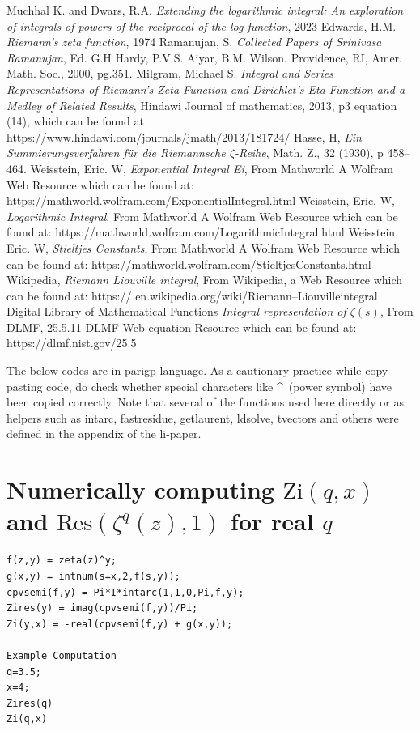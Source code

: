 \documentclass[a4paper,11pt,twoside]{amsart}
\newcommand\Zi{\mathrm{Zi}}
\newcommand\Res{\mathrm{Res}}
\begin{document}
\begin{thebibliography}{99} 
Muchhal K. and Dwars, R.A. \emph{Extending the logarithmic integral: An exploration of integrals of powers of the reciprocal of the log-function}, 2023
Edwards, H.M. \emph{Riemann's zeta function}, 1974
Ramanujan, S, \emph{Collected Papers of Srinivasa Ramanujan}, Ed. G.H Hardy, P.V.S. Aiyar, B.M. Wilson. Providence, RI, Amer. Math. Soc., 2000, pg.351.
Milgram, Michael S.  \emph{Integral and Series Representations of Riemann's Zeta Function and Dirichlet's Eta Function and a Medley of Related Results}, Hindawi Journal of mathematics, 2013, p3 equation (14), which can be found at https://www.hindawi.com/journals/jmath/2013/181724/
Hasse, H, \emph{Ein Summierungsverfahren für die Riemannsche $\zeta$-Reihe}, Math. Z., 32 (1930), p 458–464.
Weisstein, Eric. W, \emph{Exponential Integral Ei}, From Mathworld A Wolfram Web Resource which can be found at: https://mathworld.wolfram.com/ExponentialIntegral.html
Weisstein, Eric. W, \emph{Logarithmic Integral}, From Mathworld A Wolfram Web Resource which can be found at: https://mathworld.wolfram.com/LogarithmicIntegral.html
Weisstein, Eric. W, \emph{Stieltjes Constants}, From Mathworld A Wolfram Web Resource which can be found at:   https://mathworld.wolfram.com/StieltjesConstants.html
Wikipedia, \emph{Riemann Liouville integral}, From Wikipedia, a Web Resource which can be found at:  https://
en.wikipedia.org/wiki/Riemann–Liouvilleintegral
Digital Library of Mathematical Functions \emph{Integral representation of $\zeta(s)$}, From DLMF, 25.5.11	DLMF Web equation  Resource which can be found at:  https://dlmf.nist.gov/25.5
\end{thebibliography} 

\appendix
\appendixpage
The below codes are in parigp language. As a cautionary practice while copy-pasting code, do check whether special characters like \textasciicircum \, (power symbol) have been copied correctly. Note that several of the functions used here directly or as helpers such as intarc, fastresidue, getlaurent, ldsolve, tvectors and others were defined in the appendix of the li-paper.

\section{Numerically computing $\Zi(q,x)$ and $\Res(\zeta^{q}(z), 1)$ for real $q$}
\begin{verbatim}
f(z,y) = zeta(z)^y;
g(x,y) = intnum(s=x,2,f(s,y));
cpvsemi(f,y) = Pi*I*intarc(1,1,0,Pi,f,y);
Zires(y) = imag(cpvsemi(f,y))/Pi;
Zi(y,x) = -real(cpvsemi(f,y) + g(x,y));

Example Computation
q=3.5;
x=4;
Zires(q)
Zi(q,x)

\end{verbatim}
\end{document}
